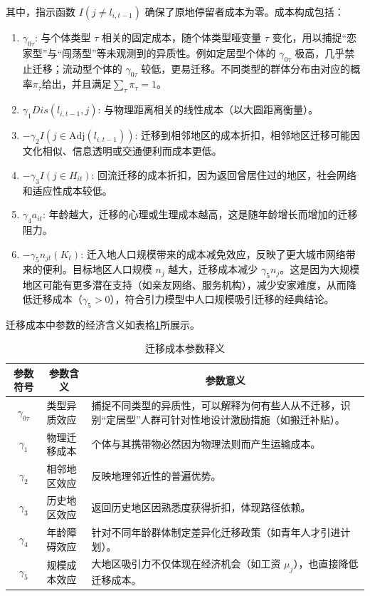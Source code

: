 \documentclass[master, final]{zufe-thesis}
\begin{document}
其中，指示函数 $I(j \neq l_{i,t-1})$ 确保了原地停留者成本为零。成本构成包括：
\begin{enumerate}
  \item $\gamma_{0\tau}$: 与个体类型 $\tau$ 相关的固定成本，随个体类型哑变量 $\tau$ 变化，用以捕捉“恋家型”与“闯荡型”等未观测到的异质性。例如定居型个体的 $\gamma_{0\tau}$ 极高，几乎禁止迁移；流动型个体的 $\gamma_{0\tau}$ 较低，更易迁移。不同类型的群体分布由对应的概率$\pi_\tau$给出，并且满足$\sum\limits_{\tau}^{} \pi_\tau=1$。

  \item $\gamma_1 Dis(l_{i,t-1}, j)$: 与物理距离相关的线性成本（以大圆距离衡量）。

  \item $-\gamma_2 I(j \in \text{Adj}(l_{i,t-1}))$: 迁移到相邻地区的成本折扣，相邻地区迁移可能因文化相似、信息透明或交通便利而成本更低。

  \item $-\gamma_3 I(j \in H_{it})$: 回流迁移的成本折扣，因为返回曾居住过的地区，社会网络和适应性成本较低。

  \item $\gamma_4 a_{it}$: 年龄越大，迁移的心理或生理成本越高，这是随年龄增长而增加的迁移阻力。

  \item $-\gamma_5 n_{jt}(K_t)$: 迁入地人口规模带来的成本减免效应，反映了更大城市网络带来的便利。目标地区人口规模 $n_j$ 越大，迁移成本减少 $\gamma_5 n_j$。这是因为大规模地区可能有更多潜在支持（如亲友网络、服务机构），减少安家难度，从而降低迁移成本（$\gamma_5 > 0$），符合引力模型中人口规模吸引迁移的经典结论。  
\end{enumerate}




迁移成本中参数的经济含义如表格\ref{tab:迁移成本参数释义}所展示。
\begin{table}[!ht]
  \centering
  \caption{迁移成本参数释义}
  \label{tab:迁移成本参数释义}
  \begin{tabularx}{\textwidth}{@{}llX@{}}
    \toprule
    \multicolumn{1}{c}{\textbf{参数符号}} & \multicolumn{1}{c}{\textbf{参数含义}} & \multicolumn{1}{c}{\textbf{参数意义}} \\ \midrule
    \multicolumn{1}{c}{$\gamma_{0\tau}$} & 类型异质效应 & 捕捉不同类型的异质性，可以解释为何有些人从不迁移，识别“定居型”人群可针对性地设计激励措施（如搬迁补贴）。\\ 
    \multicolumn{1}{c}{$\gamma_1$} & 物理迁移成本 & 个体与其携带物必然因为物理法则而产生运输成本。 \\ 
    \multicolumn{1}{c}{$\gamma_2$} & 相邻地区效应 & 反映地理邻近性的普遍优势。 \\ 
    \multicolumn{1}{c}{$\gamma_3$} & 历史地区效应 & 返回历史地区因熟悉度获得折扣，体现路径依赖。 \\ 
    \multicolumn{1}{c}{$\gamma_4$} & 年龄障碍效应 & 针对不同年龄群体制定差异化迁移政策（如青年人才引进计划）。\\ 
    \multicolumn{1}{c}{$\gamma_5$} & 规模成本效应 & 大地区吸引力不仅体现在经济机会（如工资 $\mu_j$），也直接降低迁移成本。\\ \bottomrule
  \end{tabularx}
\end{table}
\end{document}
